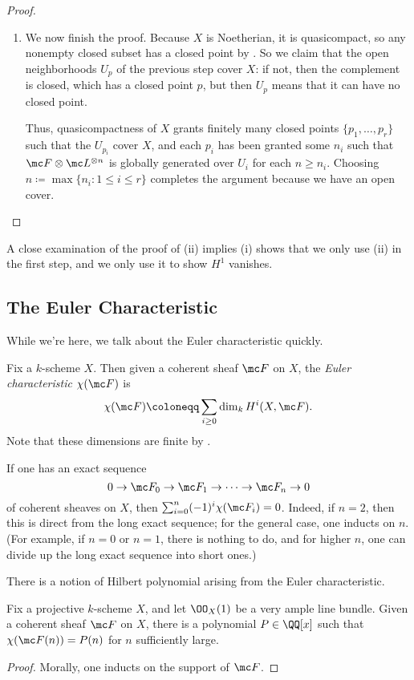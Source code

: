 \documentclass[../notes.tex]{subfiles}
\begin{document}
\begin{proof}
\begin{enumerate}
		\item We now finish the proof. Because $X$ is Noetherian, it is quasicompact, so any nonempty closed subset has a closed point by . So we claim that the open neighborhoods $U_p$ of the previous step cover $X$: if not, then the complement is closed, which has a closed point $p$, but then $U_p$ means that it can have no closed point.

		Thus, quasicompactness of $X$ grants finitely many closed points $\{p_1,\ldots,p_r\}$ such that the $U_{p_i}$ cover $X$, and each $p_i$ has been granted some $n_i$ such that $\mc F\otimes\mc L^{\otimes n}$ is globally generated over $U_i$ for each $n\ge n_i$. Choosing $n\coloneqq\max\{n_i:1\le i\le r\}$ completes the argument because we have an open cover.
		\qedhere
	\end{enumerate}
\end{proof}
\begin{remark}
	A close examination of the proof of (ii) implies (i) shows that we only use (ii) in the first step, and we only use it to show $H^1$ vanishes.
\end{remark}

\subsection{The Euler Characteristic}
While we're here, we talk about the Euler characteristic quickly.
\begin{definition}
	Fix a $k$-scheme $X$. Then given a coherent sheaf $\mc F$ on $X$, the \textit{Euler characteristic} $\chi(\mc F)$ is
	\[\chi(\mc F)\coloneqq\sum_{i\ge0}\dim_kH^i(X,\mc F).\]
	Note that these dimensions are finite by .
\end{definition}
\begin{remark}
	If one has an exact sequence
	\[0\to\mc F_0\to\mc F_1\to\cdots\to\mc F_n\to0\]
	of coherent sheaves on $X$, then $\sum_{i=0}^n(-1)^i\chi(\mc F_i)=0$. Indeed, if $n=2$, then this is direct from the long exact sequence; for the general case, one inducts on $n$. (For example, if $n=0$ or $n=1$, there is nothing to do, and for higher $n$, one can divide up the long exact sequence into short ones.)
\end{remark}
There is a notion of Hilbert polynomial arising from the Euler characteristic.
\begin{lemma}
	Fix a projective $k$-scheme $X$, and let $\OO_X(1)$ be a very ample line bundle. Given a coherent sheaf $\mc F$ on $X$, there is a polynomial $P\in\QQ[x]$ such that $\chi(\mc F(n))=P(n)$ for $n$ sufficiently large.
\end{lemma}
\begin{proof}
	Morally, one inducts on the support of $\mc F$.
\end{proof}
\end{document}
